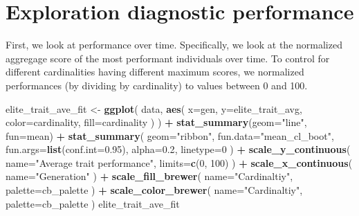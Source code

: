 \documentclass[]{book}
\newenvironment{Shaded}{\begin{snugshade}}{\end{snugshade}}
\newcommand{\DataTypeTok}[1]{\textcolor[rgb]{0.13,0.29,0.53}{#1}}
\newcommand{\DecValTok}[1]{\textcolor[rgb]{0.00,0.00,0.81}{#1}}
\newcommand{\FloatTok}[1]{\textcolor[rgb]{0.00,0.00,0.81}{#1}}
\newcommand{\KeywordTok}[1]{\textcolor[rgb]{0.13,0.29,0.53}{\textbf{#1}}}
\newcommand{\NormalTok}[1]{#1}
\newcommand{\OperatorTok}[1]{\textcolor[rgb]{0.81,0.36,0.00}{\textbf{#1}}}
\newcommand{\StringTok}[1]{\textcolor[rgb]{0.31,0.60,0.02}{#1}}
\begin{document}
\hypertarget{exploration-diagnostic-performance-1}{%
\section{Exploration diagnostic performance}\label{exploration-diagnostic-performance-1}}

First, we look at performance over time.
Specifically, we look at the normalized aggregage score of the most performant individuals over time.
To control for different cardinalities having different maximum scores, we normalized performances (by dividing by cardinality) to values between 0 and 100.

\begin{Shaded}
\begin{Highlighting}[]
\NormalTok{elite_trait_ave_fit <-}\StringTok{ }\KeywordTok{ggplot}\NormalTok{(}
\NormalTok{    data,}
    \KeywordTok{aes}\NormalTok{(}
      \DataTypeTok{x=}\NormalTok{gen,}
      \DataTypeTok{y=}\NormalTok{elite_trait_avg,}
      \DataTypeTok{color=}\NormalTok{cardinality,}
      \DataTypeTok{fill=}\NormalTok{cardinality}
\NormalTok{    )}
\NormalTok{  ) }\OperatorTok{+}
\StringTok{  }\KeywordTok{stat_summary}\NormalTok{(}\DataTypeTok{geom=}\StringTok{"line"}\NormalTok{, }\DataTypeTok{fun=}\NormalTok{mean) }\OperatorTok{+}
\StringTok{  }\KeywordTok{stat_summary}\NormalTok{(}
    \DataTypeTok{geom=}\StringTok{"ribbon"}\NormalTok{,}
    \DataTypeTok{fun.data=}\StringTok{"mean_cl_boot"}\NormalTok{,}
    \DataTypeTok{fun.args=}\KeywordTok{list}\NormalTok{(}\DataTypeTok{conf.int=}\FloatTok{0.95}\NormalTok{),}
    \DataTypeTok{alpha=}\FloatTok{0.2}\NormalTok{,}
    \DataTypeTok{linetype=}\DecValTok{0}
\NormalTok{  ) }\OperatorTok{+}
\StringTok{  }\KeywordTok{scale_y_continuous}\NormalTok{(}
    \DataTypeTok{name=}\StringTok{"Average trait performance"}\NormalTok{,}
    \DataTypeTok{limits=}\KeywordTok{c}\NormalTok{(}\DecValTok{0}\NormalTok{, }\DecValTok{100}\NormalTok{)}
\NormalTok{  ) }\OperatorTok{+}
\StringTok{  }\KeywordTok{scale_x_continuous}\NormalTok{(}
    \DataTypeTok{name=}\StringTok{"Generation"}
\NormalTok{  ) }\OperatorTok{+}
\StringTok{  }\KeywordTok{scale_fill_brewer}\NormalTok{(}
    \DataTypeTok{name=}\StringTok{"Cardinaltiy"}\NormalTok{,}
    \DataTypeTok{palette=}\NormalTok{cb_palette}
\NormalTok{  ) }\OperatorTok{+}
\StringTok{  }\KeywordTok{scale_color_brewer}\NormalTok{(}
    \DataTypeTok{name=}\StringTok{"Cardinaltiy"}\NormalTok{,}
    \DataTypeTok{palette=}\NormalTok{cb_palette}
\NormalTok{  )}
\NormalTok{elite_trait_ave_fit}
\end{Highlighting}
\end{Shaded}
\end{document}

